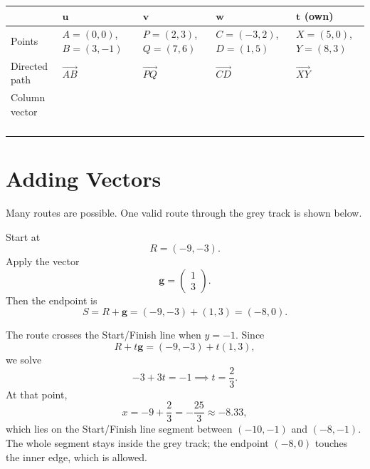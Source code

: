 \documentclass[12pt,a4paper]{article}
\begin{document}
\begin{center}
\small
\begin{tabularx}{\textwidth}{|>{\raggedright\arraybackslash}p{2.4cm}|>{\centering\arraybackslash}p{2.4cm}|>{\centering\arraybackslash}p{2.4cm}|>{\centering\arraybackslash}p{2.4cm}|>{\centering\arraybackslash}p{2.4cm}|}
\hline
& \(\mathbf{u}\) & \(\mathbf{v}\) & \(\mathbf{w}\) & \(\mathbf{t}\) (own) \\
\hline
Points
&
\(A=(0,0)\), \(B=(3,-1)\)
&
\(P=(2,3)\), \(Q=(7,6)\)
&
\(C=(-3,2)\), \(D=(1,5)\)
&
\(X=(5,0)\), \(Y=(8,3)\)
\\
\hline
Directed path
&
\(\overrightarrow{AB}\)
&
\(\overrightarrow{PQ}\)
&
\(\overrightarrow{CD}\)
&
\(\overrightarrow{XY}\)
\\
\hline
Column vector
&
\(\begin{pmatrix}3\\-1\end{pmatrix}\)
&
\(\begin{pmatrix}5\\3\end{pmatrix}\)
&
\(\begin{pmatrix}4\\3\end{pmatrix}\)
&
\(\begin{pmatrix}3\\3\end{pmatrix}\)
\\
\hline
\end{tabularx}
\end{center}

\section*{Adding Vectors}

Many routes are possible. One valid route through the grey track is shown below.

Start at
\[
R=(-9,-3).
\]
Apply the vector
\[
\mathbf{g}=\begin{pmatrix}1\\3\end{pmatrix}.
\]
Then the endpoint is
\[
S=R+\mathbf{g}=(-9,-3)+(1,3)=(-8,0).
\]

The route crosses the Start/Finish line when \(y=-1\). Since
\[
R+t\mathbf{g}=(-9,-3)+t(1,3),
\]
we solve
\[
-3+3t=-1 \implies t=\frac23.
\]
At that point,
\[
x=-9+\frac23=-\frac{25}{3}\approx -8.33,
\]
which lies on the Start/Finish line segment between \((-10,-1)\) and \((-8,-1)\). The whole segment stays inside the grey track; the endpoint \((-8,0)\) touches the inner edge, which is allowed.
\end{document}
